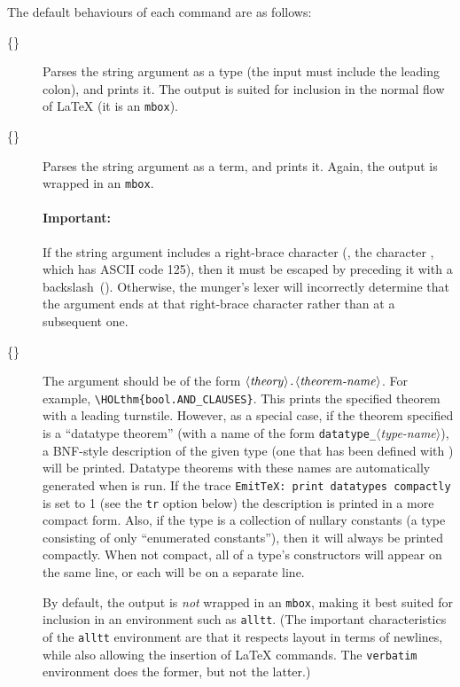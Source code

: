 The default behaviours of each command are as follows:
\begin{description}
\item[\holty\{\textit{}\}]
%
%
Parses the string argument as a type (the input must include the leading colon), and prints it.
%
The output is suited for inclusion in the normal flow of \LaTeX{} (it is an \texttt{\bs{}mbox}).
\item[\holtm\{\textit{}\}]
%
%
Parses the string argument as a term, and prints it.
%
Again, the output is wrapped in an \texttt{\bs{}mbox}.

\paragraph{Important:} If the string argument includes a right-brace character
(\ie, the character \rb, which has ASCII code 125), then it must be
escaped by preceding it with a backslash~(\bs).  Otherwise, the
munger's lexer will incorrectly determine that the argument ends at
that right-brace character rather than at a subsequent one.
\item[\holthm\{\textit{}\}]
%
%
The argument should be of the form $\langle\mbox{\textit{theory}}\rangle\texttt{.}\langle{\mbox{\textit{theorem-name}}}\rangle$.
%
For example, \verb|\HOLthm{bool.AND_CLAUSES}|.
%
This prints the specified theorem with a leading turnstile.
%
However, as a special case, if the theorem specified is a ``datatype theorem'' (with a name of the form \texttt{datatype\_}$\langle$\textit{type-name}$\rangle$), a BNF-style description of the given type (one that has been defined with ) will be printed.
%
Datatype theorems with these names are automatically generated when  is run.
If the trace \texttt{EmitTeX:~print~datatypes~compactly} is set to 1 (see the \texttt{tr} option below) the description is printed in a more compact form.
Also, if the type is a collection of nullary constants (a type consisting of only ``enumerated constants''), then it will always be printed compactly.
When not compact, all of a type's constructors will appear on the same line, or each will be on a separate line.

By default, the output is \emph{not} wrapped in an \texttt{\bs{}mbox}, making it best suited for inclusion in an environment such as \texttt{alltt}.
(The important characteristics of the \texttt{alltt} environment are that it respects layout in terms of newlines, while also allowing the insertion of \LaTeX{} commands.
The \texttt{verbatim} environment does the former, but not the latter.)
\end{description}

